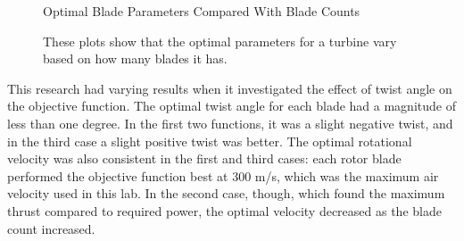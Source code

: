 \documentclass{article}
\begin{document}
\begin{figure}
  \centering

  \hspace{1em}
  \caption{Optimal Blade Parameters Compared With Blade Counts}
  \captionsetup{aboveskip=0pt,font=it}
  \caption*{These plots show that the optimal parameters for a turbine vary based on how many blades it has.}
  \label{fig:2}
\end{figure}

 This research had varying results when it investigated the effect of twist angle on the objective function. The optimal twist angle for each blade had a magnitude of less than one degree. In the first two functions, it was a slight negative twist, and in the third case a slight positive twist was better. The optimal rotational velocity was also consistent in the first and third cases: each rotor blade performed the objective function best at 300 m/s, which was the maximum air velocity used in this lab. In the second case, though, which found the maximum thrust compared to required power, the optimal velocity decreased as the blade count increased. \newline
 
\end{document}
